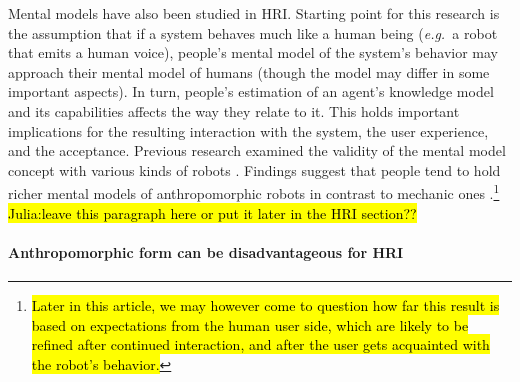 \documentclass{frontiersSCNS} %
\newcommand{\eg}{{\textit{e.g.~}}}
\begin{document}
 

Mental models have also been studied in HRI. Starting point for this research is the assumption that if a system behaves much like a human being (\eg a robot that emits a human voice), people's mental model of the system's behavior may approach their mental model of humans (though the model may differ in some important aspects). In turn, people's estimation of an agent's knowledge model and its capabilities affects the way they relate to it. This holds important implications for the resulting interaction with the system, the user experience, and the acceptance. Previous research examined the validity of the mental model concept with various kinds of robots \cite{schmitz_concepts_2011,kiesler_mental_2002}. Findings suggest that people tend to hold richer mental models of anthropomorphic robots in contrast to mechanic ones \cite{kiesler_mental_2002}.\footnote{\hl{Later in this article, we may however come to question how far this result is based on expectations from the human user side, which are likely to be refined after continued interaction, and after the user gets acquainted with the robot's behavior.}} \hl{Julia:leave this paragraph here or put it later in the HRI section??}


\paragraph*{Anthropomorphic form can be disadvantageous for HRI\\}
\end{document}
